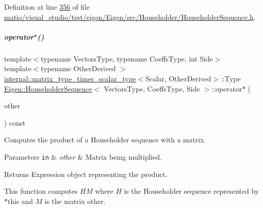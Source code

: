 Definition at line \hyperlink{matio_2visual__studio_2test_2eigen_2_eigen_2src_2_householder_2_householder_sequence_8h_source_l00356}{356} of file \hyperlink{matio_2visual__studio_2test_2eigen_2_eigen_2src_2_householder_2_householder_sequence_8h_source}{matio/visual\+\_\+studio/test/eigen/\+Eigen/src/\+Householder/\+Householder\+Sequence.\+h}.

\mbox{\label{group___householder___module_ac57e5a22f1646e04a4f8b4cba3825928}} 
\subparagraph{\texorpdfstring{operator$\ast$()}{operator*()}\hspace{0.1cm}{\footnotesize\ttfamily [2/2]}}
{\footnotesize\ttfamily template$<$typename Vectors\+Type, typename Coeffs\+Type, int Side$>$ \\
template$<$typename Other\+Derived $>$ \\
\hyperlink{struct_eigen_1_1internal_1_1matrix__type__times__scalar__type}{internal\+::matrix\+\_\+type\+\_\+times\+\_\+scalar\+\_\+type}$<$Scalar, Other\+Derived$>$\+::Type \hyperlink{group___householder___module_class_eigen_1_1_householder_sequence}{Eigen\+::\+Householder\+Sequence}$<$ Vectors\+Type, Coeffs\+Type, Side $>$\+::operator$\ast$ (\begin{DoxyParamCaption}\item[{const \hyperlink{group___core___module_class_eigen_1_1_matrix_base}{Matrix\+Base}$<$ Other\+Derived $>$ \&}]{other }\end{DoxyParamCaption}) const\hspace{0.3cm}{\ttfamily [inline]}}



Computes the product of a Householder sequence with a matrix. 


\begin{DoxyParams}[1]{Parameters}
\mbox{\tt in}  & {\em other} & Matrix being multiplied. \\
\hline
\end{DoxyParams}
\begin{DoxyReturn}{Returns}
Expression object representing the product.
\end{DoxyReturn}
This function computes $ HM $ where $ H $ is the Householder sequence represented by {\ttfamily $\ast$this} and $ M $ is the matrix {\ttfamily other}. 

